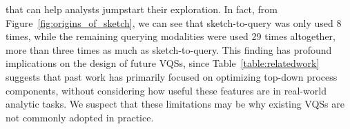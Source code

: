  that can help analysts jumpstart their exploration.
 In fact, from Figure~\ref{fig:origins_of_sketch},
 we can see that sketch-to-query was only used
 8 times, while the remaining querying modalities were used 29 times altogether,
 more than three times as much as sketch-to-query.
 This finding has profound implications
 on the design of future VQSs, since Table~\ref{table:relatedwork}
 suggests that past work has primarily focused
 on optimizing top-down process components,
 without considering how useful these features
 are in real-world analytic tasks.
 We suspect that these limitations
 may be why existing VQSs are not commonly adopted in practice. 

 

